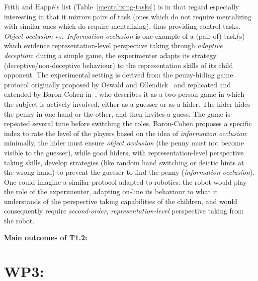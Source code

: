\documentclass[11pt,a4paper]{report}
\begin{document}
Frith and Happé's list (Table~\ref{mentalizing-tasks}) is in that regard
especially interesting in that it mirrors pairs of task (ones which do not
require mentalizing with similar ones which do require mentalizing), thus
providing control tasks.  \emph{Object occlusion} vs.~\emph{Information
occlusion} is one example of a (pair of) task(s) which evidence
representation-level perspective taking through \emph{adaptive deception}:
during a simple game, the experimenter adapts its strategy
(deceptive/non-deceptive behaviour) to the representation skills of its child
opponent. The experimental setting is derived from the penny-hiding game
protocol originally proposed by Oswald and Ollendick~\cite{oswald1989role} and
replicated and extended by Baron-Cohen in~\cite{baron1992out}, who describes it
as a two-person game in which the subject is actively involved, either as a
guesser or as a hider. The hider hides the penny in one hand or the other, and
then invites a guess. The game is repeated several time before switching the
roles. Baron-Cohen proposes a specific index to rate the level of the players
based on the idea of \emph{information occlusion}: minimally, the hider must
ensure \emph{object occlusion} (the penny must not become visible to the
guesser), while good hiders, with representation-level perspective taking
skills, develop strategies (like random hand switching or deictic hints at the
wrong hand) to prevent the guesser to find the penny (\emph{information
occlusion}). One could imagine a similar protocol adapted to robotics: the robot
would play the role of the experimenter, adapting on-line its
behaviour to what it understands of the perspective taking capabilities of the
children, and would consequently require \emph{second-order},
\emph{representation-level} perspective taking from the robot.

\begin{framed}
    {\bf Main outcomes of T1.2:}
\end{framed}



\section{WP3: \textbf{\wpThree}} 
\end{document}
